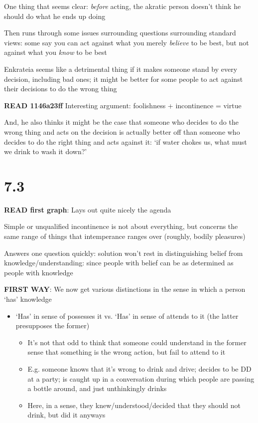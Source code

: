 \documentclass[11pt]{article}
\begin{document}
\noindent One thing that seems clear: \emph{before} acting, the akratic person doesn't think he should do what he ends up doing
\vspace*{2mm}

\noindent Then runs through some issues surrounding questions surrounding standard views: some say you can act against what you merely \emph{believe} to be best, but not against what you \emph{know} to be best
\vspace*{2mm}

\noindent Enkrateia seems like a detrimental thing if it makes someone stand by every decision, including bad ones; it might be better for some people to act against their decisions to do the wrong thing
\vspace*{2mm}

\noindent \textbf{READ 1146a23ff} Interesting argument: foolishness + incontinence = virtue
\vspace*{2mm}

\noindent And, he also thinks it might be the case that someone who decides to do the wrong thing and acts on the decision is actually better off than someone who decides to do the right thing and acts against it: `if water chokes us, what must we drink to wash it down?'

\section{7.3}

\noindent\textbf{READ first graph}: Lays out quite nicely the agenda
\vspace*{2mm}

\noindent Simple or unqualified incontinence is not about everything, but concerns the same range of things that intemperance ranges over (roughly, bodily pleasures)
\vspace*{2mm}

\noindent Answers one question quickly: solution won't rest in distinguishing belief from knowledge/understanding: since people with belief can be as determined as people with knowledge
\vspace*{2mm}

\noindent\textbf{FIRST WAY}: We now get various distinctions in the sense in which a person `has' knowledge

\begin{itemize}\item{`Has' in sense of possesses it vs. `Has' in sense of attends to it (the latter presupposes the former)}\begin{itemize}\item{It's not that odd to think that someone could understand in the former sense that something is the wrong action, but fail to attend to it}\item{E.g. someone knows that it's wrong to drink and drive; decides to be DD at a party; is caught up in a conversation during which people are passing a bottle around, and just unthinkingly drinks}\item{Here, in a sense, they knew/understood/decided that they should not drink, but did it anyways}\end{itemize}\end{itemize}
\end{document}
